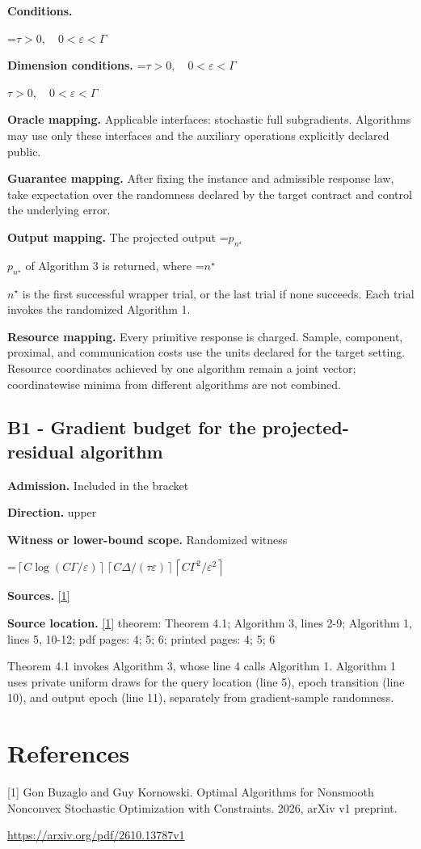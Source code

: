 \documentclass[10pt,a4paper]{article}
\newcommand{\AtlasMath}[1]{\par\begingroup\centering\setbox0=\hbox{$\displaystyle #1$}\ifdim\wd0>1.4\linewidth\typeout{ATLAS WIDE FORMULA: \the\wd0}\fi\ifdim\wd0>\linewidth\resizebox{\linewidth}{!}{\box0}\else\box0\fi\par\endgroup}
\newcommand{\AtlasInlineMath}[1]{\begingroup\setbox0=\hbox{$#1$}\ifdim\wd0>.4\linewidth\endgroup\AtlasMath{#1}\else\endgroup$#1$\fi}
\begin{document}
\textbf{Conditions.} 
\AtlasMath{\tau>0,\quad0<\varepsilon<\Gamma}


\textbf{Dimension conditions.} \AtlasInlineMath{\tau>0,\quad0<\varepsilon<\Gamma}

\textbf{Oracle mapping.} Applicable interfaces: stochastic full subgradients. Algorithms may use only these interfaces and the auxiliary operations explicitly declared public.

\textbf{Guarantee mapping.} After fixing the instance and admissible response law, take expectation over the randomness declared by the target contract and control the underlying error.

\textbf{Output mapping.} The projected output \AtlasInlineMath{p_{n^\star}} of Algorithm 3 is returned, where \AtlasInlineMath{n^\star} is the first successful wrapper trial, or the last trial if none succeeds. Each trial invokes the randomized Algorithm 1.

\textbf{Resource mapping.} Every primitive response is charged. Sample, component, proximal, and communication costs use the units declared for the target setting. Resource coordinates achieved by one algorithm remain a joint vector; coordinatewise minima from different algorithms are not combined.

\subsection{B1 - Gradient budget for the projected-residual algorithm}
\textbf{Admission.} Included in the bracket

\textbf{Direction.} upper

\textbf{Witness or lower-bound scope.} Randomized witness

\AtlasMath{\left\lceil C\log(C\Gamma/\varepsilon)\right\rceil\left\lceil C\Delta/(\tau\varepsilon)\right\rceil\left\lceil C\Gamma^2/\varepsilon^2\right\rceil}
\textbf{Sources.} \href{https://arxiv.org/pdf/2610.13787v1}{[1]}

\textbf{Source location.} \href{https://arxiv.org/pdf/2610.13787v1}{[1]} theorem: Theorem 4.1; Algorithm 3, lines 2-9; Algorithm 1, lines 5, 10-12; pdf pages: 4; 5; 6; printed pages: 4; 5; 6

Theorem 4.1 invokes Algorithm 3, whose line 4 calls Algorithm 1. Algorithm 1 uses private uniform draws for the query location (line 5), epoch transition (line 10), and output epoch (line 11), separately from gradient-sample randomness.

\section{References}
[1] Gon Buzaglo and Guy Kornowski. Optimal Algorithms for Nonsmooth Nonconvex Stochastic Optimization with Constraints. 2026, arXiv v1 preprint.

\url{https://arxiv.org/pdf/2610.13787v1}
\end{document}
